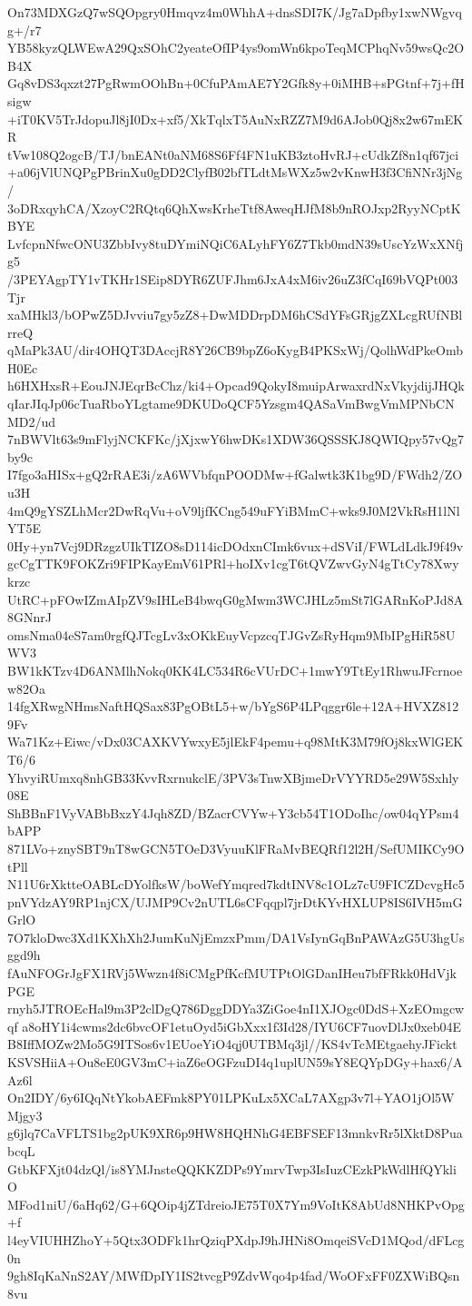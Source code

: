 On73MDXGzQ7wSQOpgry0Hmqvz4m0WhhA+dnsSDI7K/Jg7aDpfby1xwNWgvqg+/r7
YB58kyzQLWEwA29QxSOhC2yeateOfIP4ys9omWn6kpoTeqMCPhqNv59wsQc2OB4X
Gq8vDS3qxzt27PgRwmOOhBn+0CfuPAmAE7Y2Gfk8y+0iMHB+sPGtnf+7j+fHsigw
+iT0KV5TrJdopuJl8jI0Dx+xf5/XkTqlxT5AuNxRZZ7M9d6AJob0Qj8x2w67mEKR
tVw108Q2ogcB/TJ/bnEANt0aNM68S6Ff4FN1uKB3ztoHvRJ+cUdkZf8n1qf67jci
+a06jVlUNQPgPBrinXu0gDD2ClyfB02bfTLdtMsWXz5w2vKnwH3f3CfiNNr3jNg/
3oDRxqyhCA/XzoyC2RQtq6QhXwsKrheTtf8AweqHJfM8b9nROJxp2RyyNCptKBYE
LvfcpnNfwcONU3ZbbIvy8tuDYmiNQiC6ALyhFY6Z7Tkb0mdN39sUscYzWxXNfjg5
/3PEYAgpTY1vTKHr1SEip8DYR6ZUFJhm6JxA4xM6iv26uZ3fCqI69bVQPt003Tjr
xaMHkl3/bOPwZ5DJvviu7gy5zZ8+DwMDDrpDM6hCSdYFsGRjgZXLcgRUfNBlrreQ
qMaPk3AU/dir4OHQT3DAccjR8Y26CB9bpZ6oKygB4PKSxWj/QolhWdPkeOmbH0Ec
h6HXHxsR+EouJNJEqrBcChz/ki4+Opcad9QokyI8muipArwaxrdNxVkyjdijJHQk
qIarJIqJp06cTuaRboYLgtame9DKUDoQCF5Yzsgm4QASaVmBwgVmMPNbCNMD2/ud
7nBWVlt63s9mFlyjNCKFKc/jXjxwY6hwDKs1XDW36QSSSKJ8QWIQpy57vQg7by9c
I7fgo3aHISx+gQ2rRAE3i/zA6WVbfqnPOODMw+fGalwtk3K1bg9D/FWdh2/ZOu3H
4mQ9gYSZLhMcr2DwRqVu+oV9ljfKCng549uFYiBMmC+wks9J0M2VkRsH1lNlYT5E
0Hy+yn7Vcj9DRzgzUIkTIZO8sD114icDOdxnCImk6vux+dSViI/FWLdLdkJ9f49v
gcCgTTK9FOKZri9FIPKayEmV61PRl+hoIXv1cgT6tQVZwvGyN4gTtCy78Xwykrzc
UtRC+pFOwIZmAIpZV9sIHLeB4bwqG0gMwm3WCJHLz5mSt7lGARnKoPJd8A8GNnrJ
omsNma04eS7am0rgfQJTcgLv3xOKkEuyVcpzcqTJGvZsRyHqm9MbIPgHiR58UWV3
BW1kKTzv4D6ANMlhNokq0KK4LC534R6cVUrDC+1mwY9TtEy1RhwuJFcrnoew82Oa
14fgXRwgNHmsNaftHQSax83PgOBtL5+w/bYgS6P4LPqggr6le+12A+HVXZ8129Fv
Wa71Kz+Eiwc/vDx03CAXKVYwxyE5jlEkF4pemu+q98MtK3M79fOj8kxWlGEKT6/6
YhvyiRUmxq8nhGB33KvvRxrnukclE/3PV3sTnwXBjmeDrVYYRD5e29W5Sxhly08E
ShBBnF1VyVABbBxzY4Jqh8ZD/BZacrCVYw+Y3cb54T1ODoIhc/ow04qYPsm4bAPP
871LVo+znySBT9nT8wGCN5TOeD3VyuuKlFRaMvBEQRf12l2H/SefUMIKCy9OtPll
N11U6rXktteOABLcDYolfksW/boWefYmqred7kdtINV8c1OLz7cU9FICZDcvgHc5
pnVYdzAY9RP1njCX/UJMP9Cv2nUTL6sCFqqpl7jrDtKYvHXLUP8IS6IVH5mGGrlO
7O7kloDwc3Xd1KXhXh2JumKuNjEmzxPmm/DA1VsIynGqBnPAWAzG5U3hgUsggd9h
fAuNFOGrJgFX1RVj5Wwzn4f8iCMgPfKcfMUTPtOlGDanIHeu7bfFRkk0HdVjkPGE
rnyh5JTROEcHal9m3P2clDgQ786DggDDYa3ZiGoe4nI1XJOgc0DdS+XzEOmgcwqf
a8oHY1i4cwms2dc6bvcOF1etuOyd5iGbXxx1f3Id28/IYU6CF7uovDlJx0xeb04E
B8IffMOZw2Mo5G9ITSos6v1EUoeYiO4qj0UTBMq3jl//KS4vTcMEtgaehyJFickt
KSVSHiiA+Ou8eE0GV3mC+iaZ6eOGFzuDI4q1uplUN59sY8EQYpDGy+hax6/AAz6l
On2IDY/6y6IQqNtYkobAEFmk8PY01LPKuLx5XCaL7AXgp3v7l+YAO1jOl5WMjgy3
g6jlq7CaVFLTS1bg2pUK9XR6p9HW8HQHNhG4EBFSEF13mnkvRr5lXktD8PuabcqL
GtbKFXjt04dzQl/is8YMJnsteQQKKZDPs9YmrvTwp3IsIuzCEzkPkWdlHfQYkliO
MFod1niU/6aHq62/G+6QOip4jZTdreioJE75T0X7Ym9VoItK8AbUd8NHKPvOpg+f
l4eyVIUHHZhoY+5Qtx3ODFk1hrQziqPXdpJ9hJHNi8OmqeiSVcD1MQod/dFLcg0n
9gh8IqKaNnS2AY/MWfDpIY1IS2tvcgP9ZdvWqo4p4fad/WoOFxFF0ZXWiBQsn8vu
